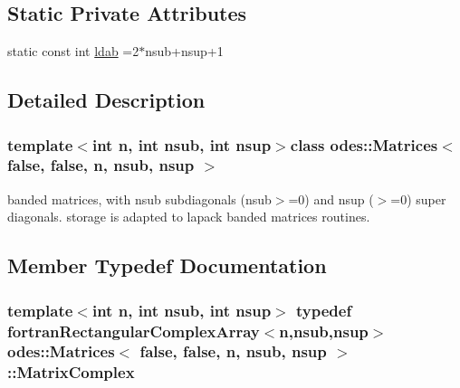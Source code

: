 \subsection*{Static Private Attributes}
\begin{DoxyCompactItemize}
\item 
static const int \hyperlink{classodes_1_1Matrices_3_01false_00_01false_00_01n_00_01nsub_00_01nsup_01_4_a8064440c208443dcb24a817ff763037e}{ldab} =2$\ast$nsub+nsup+1
\end{DoxyCompactItemize}


\subsection{Detailed Description}
\subsubsection*{template$<$int n, int nsub, int nsup$>$class odes\+::\+Matrices$<$ false, false, n, nsub, nsup $>$}

banded matrices, with nsub subdiagonals (nsub$>$=0) and nsup ($>$=0) super diagonals. storage is adapted to lapack banded matrices routines. 

\subsection{Member Typedef Documentation}
\hypertarget{classodes_1_1Matrices_3_01false_00_01false_00_01n_00_01nsub_00_01nsup_01_4_aeedabda8f5222d638b092cd1e4cf55f0}{}
\subsubsection[{Matrix\+Complex}]{\setlength{\rightskip}{0pt plus 5cm}template$<$int n, int nsub, int nsup$>$ typedef {\bf fortran\+Rectangular\+Complex\+Array}$<$n,nsub,nsup$>$ {\bf odes\+::\+Matrices}$<$ false, false, n, nsub, nsup $>$\+::{\bf Matrix\+Complex}}\label{classodes_1_1Matrices_3_01false_00_01false_00_01n_00_01nsub_00_01nsup_01_4_aeedabda8f5222d638b092cd1e4cf55f0}
\hypertarget{classodes_1_1Matrices_3_01false_00_01false_00_01n_00_01nsub_00_01nsup_01_4_a16870437fa110da1b60636c6e108b357}{}
